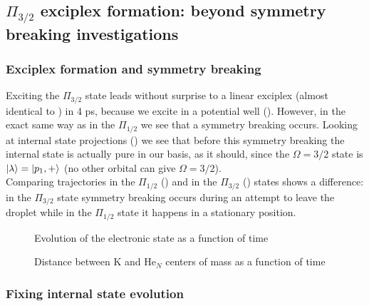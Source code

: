 \subsection{$\Pi_{3/2}$ exciplex formation: beyond symmetry breaking investigations}

\subsubsection{Exciplex formation and symmetry breaking}

Exciting the $\Pi_{3/2}$ state leads without surprise to a linear exciplex (almost identical to ) in 4 ps, because we excite in a potential well (). However, in the exact same way as in the $\Pi_{1/2}$ we see that a symmetry breaking occurs. Looking at internal state projections () we see that before this symmetry breaking the internal state is actually pure in our basis, as it should, since the $\Omega=3/2$ state is  $\ket{\lambda}=\ket{p_1,+}$ (no other orbital can give $\Omega=3/2$). \\

Comparing trajectories in the $\Pi_{1/2}$  () and in the $\Pi_{3/2}$ () states shows a difference: in the $\Pi_{3/2}$ state  symmetry breaking occurs during an attempt to leave the droplet while in the $\Pi_{1/2}$ state it happens in a stationary position.

\begin{figure}[h!]
	\centering
	\begin{minipage}[c]{0.48\linewidth}
		
		\vspace{0.2\baselineskip}
		\caption{Evolution of the electronic state as a function of time\label{fig:4P-p32-f-proj}}
	\end{minipage}
\hfill
	\begin{minipage}[c]{0.48\linewidth}
		
		\vspace{0.2\baselineskip}
		\caption{Distance between K and He$_N$ centers of mass as a function of time\label{fig:4P-p32-free-pos}}
	\end{minipage}
\end{figure}

\subsubsection{Fixing internal state evolution}

